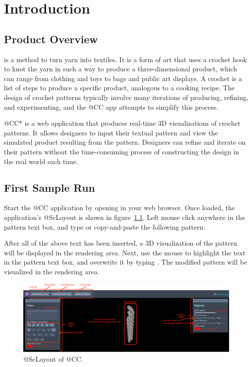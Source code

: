 \documentclass[main.tex]{subfiles}
\begin{document}
\chapter{Introduction}\label{chp:introduction}

\section{Product Overview}

 is a method to turn yarn into textiles. It is a form of art that uses a crochet hook to knot the yarn in such a way to produce a three-dimensional product, which can range from clothing and toys to bags and public art displays.
A crochet  is a list of steps to produce a specific product, analogous to a cooking recipe. The design of crochet patterns typically involve many iterations of producing, refining, and experimenting, and the @CC app attempts to simplify this process.

@CC* is a web application that produces real-time 3D visualizations of crochet patterns. It allows designers to input their textual pattern and view the simulated product resulting from the pattern. Designers can refine and iterate on their pattern without the time-consuming process of constructing the design in the real world each time.

\section{First Sample Run}

Start the @CC application by opening \href{https://crochetcraft.jtai.ca}{} in your web browser. Once loaded, the application's @ScLayout is shown in figure~\ref{fig:layout}. Left mouse click anywhere in the pattern text box, and type or copy-and-paste the following pattern:


After all of the above text has been inserted, a 3D visualization of the pattern will be displayed in the rendering area. Next, use the mouse to highlight the text  in the pattern text box, and overwrite it by typing . The modified pattern will be visualized in the rendering area.

\begin{figure}[htbp]
    \centering
    \includegraphics[width=\linewidth]{layout.png}
    \caption{@ScLayout of @CC.}
    \label{fig:layout}
\end{figure}
\end{document}
